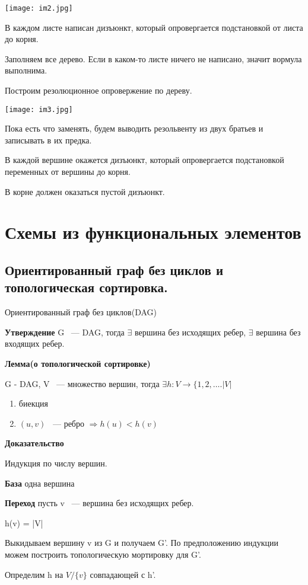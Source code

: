 \documentclass[12pt]{article}
\begin{document}
\begin{center} 
\texttt{[image: im2.jpg]} 
\end{center}

В каждом листе написан дизъюнкт, который опровергается подстановкой от листа до корня. 

Заполняем все дерево. Если в каком-то листе ничего не написано, значит вормула выполнима. 

Построим резолюционное опровержение по дереву. 


\begin{center} 
\texttt{[image: im3.jpg]} 
\end{center}

Пока есть что заменять, будем выводить резольвенту из двух братьев и записывать в их предка. 

В каждой вершине окажется дизъюнкт, который опровергается подстановкой переменных от вершины до корня. 

В корне должен оказаться пустой дизъюнкт. 

\section{Схемы из функциональных элементов}

\subsection{Ориентированный граф без циклов и топологическая сортировка.}

Ориентированный граф без циклов(DAG)

{\bf Утверждение} G ~--- DAG, тогда $\exists$ вершина без исходящих ребер, $\exists$ вершина без входящих ребер. 

\begin{description}
\item {\bf Лемма(о топологической сортировке)}

G - DAG, V ~--- множество вершин, тогда $\exists h: V \to \{1, 2, \ldots. |V|$

\begin{enumerate}
\item биекция
\item $(u, v)$ ~--- ребро $\Rightarrow h(u) < h(v)$ 
\end{enumerate} 

\item {\bf Доказательство}

Индукция по числу вершин.

{\bf База} одна вершина

{\bf Переход} пусть v ~--- вершина без исходящих ребер.

h(v) = |V|

Выкидываем вершину v из G и получаем G'. По предположению индукции можем построить топологическую мортировку для G'. 

Определим h на $V/\{v\}$  совпадающей с h'.
\end{description}
\end{document}
